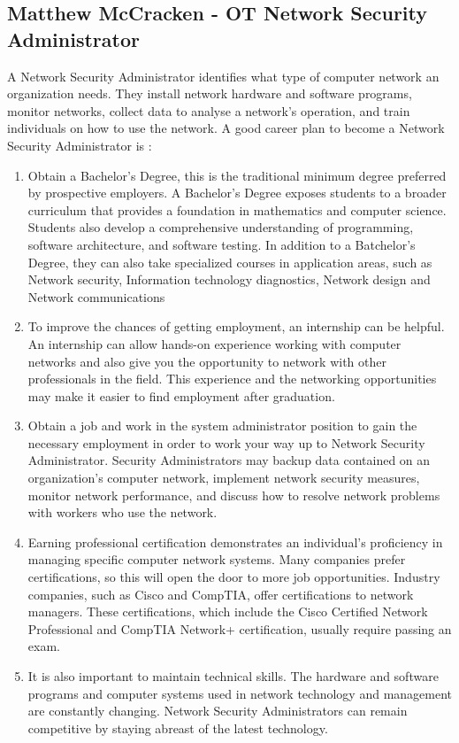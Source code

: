 \documentclass[11pt, oneside, a4paper, titlepage]{article}
\begin{document}
\subsection{Matthew McCracken - OT Network Security Administrator}
A Network Security Administrator identifies what type of computer network an organization needs. They install network hardware and software programs, monitor networks, collect data to analyse a network's operation, and train individuals on how to use the network. A good career plan to become a Network Security Administrator is :  
\begin{enumerate}
	\item
    Obtain a Bachelor’s Degree, this is the traditional minimum degree preferred by prospective employers. A Bachelor’s Degree exposes students to a broader curriculum that provides a foundation in mathematics and computer science. Students also develop a comprehensive understanding of programming, software architecture, and software testing. In addition to a Batchelor’s Degree, they can also take specialized courses in application areas, such as Network security, Information technology diagnostics, Network design and Network communications 
	\item
    To improve the chances of getting employment, an internship can be helpful. An internship can allow hands-on experience working with computer networks and also give you the opportunity to network with other professionals in the field. This experience and the networking opportunities may make it easier to find employment after graduation. 
	\item
    Obtain a job and work in the system administrator position to gain the necessary employment in order to work your way up to Network Security Administrator. Security Administrators may backup data contained on an organization's computer network, implement network security measures, monitor network performance, and discuss how to resolve network problems with workers who use the network. 
	\item
    Earning professional certification demonstrates an individual's proficiency in managing specific computer network systems. Many companies prefer certifications, so this will open the door to more job opportunities. Industry companies, such as Cisco and CompTIA, offer certifications to network managers. These certifications, which include the Cisco Certified Network Professional and CompTIA Network+ certification, usually require passing an exam.
	\item
    It is also important to maintain technical skills. The hardware and software programs and computer systems used in network technology and management are constantly changing. Network Security Administrators can remain competitive by staying abreast of the latest technology. 
\end{enumerate}
\end{document}
